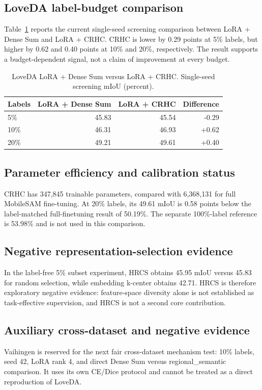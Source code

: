 \documentclass[10pt,twocolumn]{article}
\begin{document}
\subsection{LoveDA label-budget comparison}
Table~\ref{tab:budget} reports the current single-seed screening comparison between LoRA + Dense Sum and LoRA + CRHC. CRHC is lower by 0.29 points at 5\% labels, but higher by 0.62 and 0.40 points at 10\% and 20\%, respectively. The result supports a budget-dependent signal, not a claim of improvement at every budget.

\begin{table}[t]
\centering
\caption{LoveDA LoRA + Dense Sum versus LoRA + CRHC. Single-seed screening mIoU (percent).}
\label{tab:budget}
\begin{tabular}{lrrr}
\toprule
Labels & LoRA + Dense Sum & LoRA + CRHC & Difference\\
\midrule
5\% & 45.83 & 45.54 & -0.29\\
10\% & 46.31 & 46.93 & +0.62\\
20\% & 49.21 & 49.61 & +0.40\\
\bottomrule
\end{tabular}
\end{table}

\subsection{Parameter efficiency and calibration status}
CRHC has 347,845 trainable parameters, compared with 6,368,131 for full MobileSAM fine-tuning. At 20\% labels, its 49.61 mIoU is 0.58 points below the label-matched full-finetuning result of 50.19\%. The separate 100\%-label reference is 53.98\% and is not used in this comparison.

\subsection{Negative representation-selection evidence}
In the label-free 5\% subset experiment, HRCS obtains 45.95 mIoU versus 45.83 for random selection, while embedding k-center obtains 42.71. HRCS is therefore exploratory negative evidence: feature-space diversity alone is not established as task-effective supervision, and HRCS is not a second core contribution.

\subsection{Auxiliary cross-dataset and negative evidence}
Vaihingen is reserved for the next fair cross-dataset mechanism test: 10\% labels, seed 42, LoRA rank 4, and direct Dense Sum versus regional\_semantic comparison. It uses its own CE/Dice protocol and cannot be treated as a direct reproduction of LoveDA.
\end{document}
